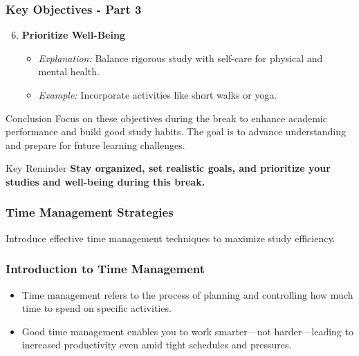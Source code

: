 \documentclass[aspectratio=169]{beamer}
\begin{document}
\begin{frame}[fragile]
    \frametitle{Key Objectives - Part 3}
    
    \begin{enumerate}
        \setcounter{enumi}{5} %
        \item \textbf{Prioritize Well-Being}
        \begin{itemize}
            \item \textit{Explanation:} Balance rigorous study with self-care for physical and mental health.
            \item \textit{Example:} Incorporate activities like short walks or yoga.
        \end{itemize}
    \end{enumerate}
    
    \begin{block}{Conclusion}
        Focus on these objectives during the break to enhance academic performance and build good study habits. The goal is to advance understanding and prepare for future learning challenges.
    \end{block}
    
    \begin{block}{Key Reminder}
        \textbf{Stay organized, set realistic goals, and prioritize your studies and well-being during this break.}
    \end{block}
\end{frame}

\begin{frame}[fragile]
    \frametitle{Time Management Strategies}
    Introduce effective time management techniques to maximize study efficiency.
\end{frame}

\begin{frame}[fragile]
    \frametitle{Introduction to Time Management}
    \begin{itemize}
        \item Time management refers to the process of planning and controlling how much time to spend on specific activities.
        \item Good time management enables you to work smarter—not harder—leading to increased productivity even amid tight schedules and pressures.
    \end{itemize}
\end{frame}
\end{document}
